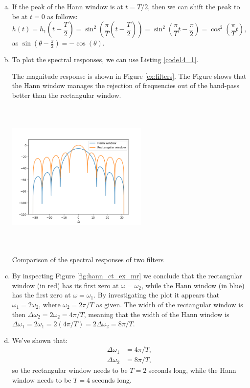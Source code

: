 \begin{enumerate}
\begin{enumerate}[a)]
\item If the peak of the Hann window is at $t=T/2$, then we can shift the peak to be at $t=0$ as follows:
$$h(t)=h_{1}\left(t-\frac{T}{2}\right)=\sin^{2}\left(\frac{\pi}{T}\left(t-\frac{T}{2}\right)\right)=\sin^{2}\left(\frac{\pi}{T}t-\frac{\pi}{2}\right)=\cos^{2}\left(\frac{\pi}{T}t\right),$$
as $\sin\left(\theta-\frac{\pi}{2}\right)=-\cos(\theta)$. 

\item To plot the spectral responses, we can use Listing \ref{code14_1}.


The magnitude response is shown in Figure \ref{ex:filters}. The Figure shows that the Hann window manages the 
rejection of frequencies out of the band-pass better than the rectangular window. 
\begin{marginfigure}
    \includegraphics[width=7.0cm,height=7.5cm]{ch14/figures/filters.png}
    \caption{Comparison of the spectral responses of two filters}
    \label{ex:filters}
\end{marginfigure}

\item By inspecting Figure \ref{fig:hann_ct_ex_mr} we conclude that the rectangular window (in red) 
has its first zero at $\omega=\omega_{2}$, while the Hann window (in blue) has the first zero at $\omega=\omega_{1}$. 
By investigating the plot it appears that $\omega_{1}=2\omega_{2}$, where $\omega_{2}=2\pi /T$ as given. 
The width of the rectangular window is then $\Delta\omega_{2}=2\omega_{2}=4\pi/T$, meaning that the 
width of the Hann window is $\Delta\omega_{1}=2\omega_{1}=2(4\pi/T)=2\Delta\omega_{2}=8\pi /T$. 

\item We've shown that:
\begin{align*}
    \Delta\omega_{1}&=4\pi/T, \\
    \Delta\omega_{2}&=8\pi/T,
\end{align*}
so the rectangular window needs to be $T=2$ seconds long, while the Hann window needs to be $T=4$ seconds long. 


\end{enumerate}
\end{enumerate}
